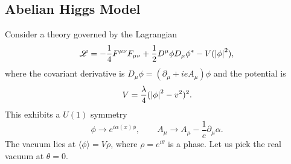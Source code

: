 \subsection{Abelian Higgs Model}%
\label{sub:abelian_higgs_model}

Consider a theory governed by the Lagrangian
\begin{equation}
  \mathscr{L} = -\frac{1}{4} F^{\mu\nu} F_{\mu\nu} + \frac{1}{2} D^{\mu} \phi D_{\mu} \phi^* - V(\abs{\phi}^2),
\end{equation}
where the covariant derivative is $ D_{\mu} \phi = (\partial_{\mu} + i e A_{\mu}) \phi $ and the potential is
\begin{equation}
  V = \frac{\lambda}{4} (\abs{\phi}^2 - v^2)^2.
\end{equation}
This exhibits a $U(1)$ symmetry
\begin{equation}
  \phi \to e^{i \alpha (x) \phi}, \qquad A_{\mu} \to A_{\mu} - \frac{1}{e} \partial_{\mu} \alpha.
\end{equation}
The vacuum lies at $\langle \phi \rangle = V \rho$, where $\rho = e^{i \theta}$ is a phase.
Let us pick the real vacuum at $\theta = 0$.

